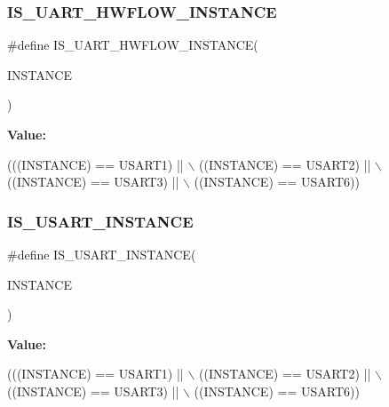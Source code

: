 \subsubsection{\texorpdfstring{I\+S\+\_\+\+U\+A\+R\+T\+\_\+\+H\+W\+F\+L\+O\+W\+\_\+\+I\+N\+S\+T\+A\+N\+CE}{IS\_UART\_HWFLOW\_INSTANCE}}
{\footnotesize\ttfamily \#define I\+S\+\_\+\+U\+A\+R\+T\+\_\+\+H\+W\+F\+L\+O\+W\+\_\+\+I\+N\+S\+T\+A\+N\+CE(\begin{DoxyParamCaption}\item[{}]{I\+N\+S\+T\+A\+N\+CE }\end{DoxyParamCaption})}

{\bfseries Value\+:}
\begin{DoxyCode}
(((INSTANCE) == USART1) || \(\backslash\)
                                           ((INSTANCE) == USART2) || \(\backslash\)
                                           ((INSTANCE) == USART3) || \(\backslash\)
                                           ((INSTANCE) == USART6))
\end{DoxyCode}
\mbox{\label{group___exported__macros_gafbce654f84a7c994817453695ac91cbe}} 
\subsubsection{\texorpdfstring{I\+S\+\_\+\+U\+S\+A\+R\+T\+\_\+\+I\+N\+S\+T\+A\+N\+CE}{IS\_USART\_INSTANCE}}
{\footnotesize\ttfamily \#define I\+S\+\_\+\+U\+S\+A\+R\+T\+\_\+\+I\+N\+S\+T\+A\+N\+CE(\begin{DoxyParamCaption}\item[{}]{I\+N\+S\+T\+A\+N\+CE }\end{DoxyParamCaption})}

{\bfseries Value\+:}
\begin{DoxyCode}
(((INSTANCE) == USART1) || \(\backslash\)
                                     ((INSTANCE) == USART2) || \(\backslash\)
                                     ((INSTANCE) == USART3) || \(\backslash\)
                                     ((INSTANCE) == USART6))
\end{DoxyCode}
\mbox{\label{group___exported__macros_ga08aeea283003a2c787227347087b5b1f}} 
